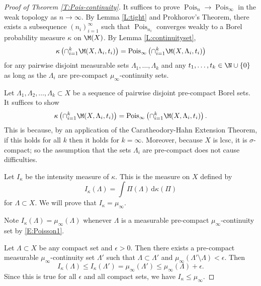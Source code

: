\documentclass[12pt]{article}
\theoremstyle{plain}
\theoremstyle{definition}
\theoremstyle{remark}
\newcommand{\G}{\Gamma}
\newcommand{\eps}{\epsilon}
\newcommand\s{\sigma}
\newcommand\Pois{\operatorname{Pois}}
\newcommand\Radon{\mathsf{Radon}}
\newcommand{\dee}{\textrm{d}}
\begin{document}
\begin{proof}[Proof of Theorem \ref{T:Pois-continuity}]
    
It suffices to prove $\Pois_n \to \Pois_\infty$ in the weak topology as $n\to\infty$. By Lemma \ref{L:tight} and Prokhorov's Theorem, there exists a subsequence $(n_i)_{i=1}^\infty$ such that $\Pois_{n_i}$ converges weakly to a Borel probability measure $\kappa$ on $\M(X)$. By Lemma \ref{L:continuityset}, 
\begin{align}\label{E:Poisson1}
    \kappa\left(\cap_{i=1}^k \M(X,\Lambda_i, t_i)\right)=\Pois_\infty\left(\cap_{i=1}^k \M(X,\Lambda_i, t_i)\right)
\end{align}
for any pairwise disjoint measurable sets $\Lambda_1,\ldots, \Lambda_k$ and any $t_1,\ldots, t_k \in \N \cup \{0\}$ as long as the $\Lambda_i$ are pre-compact $\mu_\infty$-continuity sets. 

Let $\Lambda_1,\Lambda_2,\ldots, \Lambda_k\subset X$ be a sequence of pairwise disjoint pre-compact Borel sets. It suffices to show
\begin{align}\label{E:Poisson2}
    \kappa\left(\cap_{i=1}^k \M(X,\Lambda_i, t_i)\right)=\Pois_\infty\left(\cap_{i=1}^k \M(X,\Lambda_i, t_i)\right).
\end{align}
This is because, by an application of the Caratheodory-Hahn Extension Theorem, if this holds for all $k$ then it holds for $k=\infty$. Moreover, because $X$ is lcsc, it is $\s$-compact; so the assumption that the sets $\Lambda_i$ are pre-compact does not cause difficulties.

Let $I_\kappa$ be the intensity measure of $\kappa$. This is the measure on $X$ defined by
$$I_\kappa(\Lambda) = \int \Pi(\Lambda) \, \dee \kappa(\Pi)$$
for $\Lambda \subset X$. We will prove that $I_\kappa=\mu_\infty$.

Note $I_\kappa(\Lambda) = \mu_\infty(\Lambda)$ whenever $\Lambda$ is a measurable pre-compact $\mu_\infty$-continuity set by \eqref{E:Poisson1}. 

Let $\Lambda \subset X$ be any compact set and $\eps>0$. Then there exists a pre-compact measurable $\mu_\infty$-continuity set $\Lambda'$ such that $\Lambda \subset \Lambda'$ and $\mu_\infty(\Lambda' \setminus \Lambda)<\eps$. %
Then
$$I_\kappa(\Lambda) \le I_\kappa(\Lambda') = \mu_\infty(\Lambda') \le \mu_\infty(\Lambda)+\eps.$$
Since this is true for all $\eps$ and all compact sets, we have $I_\kappa \le \mu_\infty$. 


\end{proof}
\end{document}
